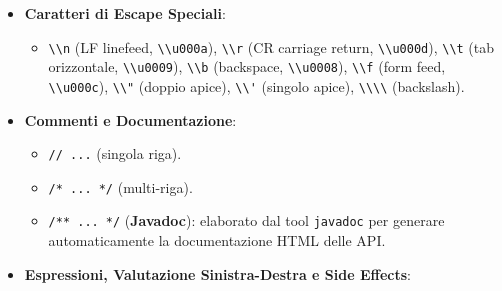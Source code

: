 \documentclass[11pt,a4paper]{article}
\newcommand{\passthrough}[1]{#1}
\providecommand{\tightlist}{\setlength{\itemsep}{0pt}\setlength{\parskip}{0pt}}
\begin{document}
\begin{itemize}
\begin{itemize}
    \begin{itemize}
    \tightlist
    \item
      \textbf{Classi}: \passthrough{\lstinline!UpperCamelCase!} (es.
      \passthrough{\lstinline!SimpleDate!},
      \passthrough{\lstinline!MainDate!}).
    \item
      \textbf{Metodi, variabili locali, campi e parametri}:
      \passthrough{\lstinline!lowerCamelCase!} (es.
      \passthrough{\lstinline!daysPerMonth!},
      \passthrough{\lstinline!myCar!}).
    \item
      \textbf{Costanti}: \passthrough{\lstinline!UPPER\_SNAKE\_CASE!}
      (es. \passthrough{\lstinline!FORMAT!},
      \passthrough{\lstinline!PI\_CONST!}).
    \end{itemize}
  \end{itemize}
\item
  \textbf{Caratteri di Escape Speciali}:

  \begin{itemize}
  \tightlist
  \item
    \passthrough{\lstinline!\\n!} (LF linefeed,
    \passthrough{\lstinline!\\u000a!}), \passthrough{\lstinline!\\r!}
    (CR carriage return, \passthrough{\lstinline!\\u000d!}),
    \passthrough{\lstinline!\\t!} (tab orizzontale,
    \passthrough{\lstinline!\\u0009!}), \passthrough{\lstinline!\\b!}
    (backspace, \passthrough{\lstinline!\\u0008!}),
    \passthrough{\lstinline!\\f!} (form feed,
    \passthrough{\lstinline!\\u000c!}), \passthrough{\lstinline!\\"!}
    (doppio apice), \passthrough{\lstinline!\\'!} (singolo apice),
    \passthrough{\lstinline!\\\\!} (backslash).
  \end{itemize}
\item
  \textbf{Commenti e Documentazione}:

  \begin{itemize}
  \tightlist
  \item
    \passthrough{\lstinline!// ...!} (singola riga).
  \item
    \passthrough{\lstinline!/* ... */!} (multi-riga).
  \item
    \passthrough{\lstinline!/** ... */!} (\textbf{Javadoc}): elaborato
    dal tool \passthrough{\lstinline!javadoc!} per generare
    automaticamente la documentazione HTML delle API.
  \end{itemize}
\item
  \textbf{Espressioni, Valutazione Sinistra-Destra e Side Effects}:


\end{itemize}
\end{document}
